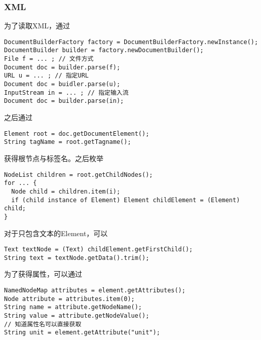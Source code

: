 \documentclass{ctexart}
\begin{document}
\subsubsection*{XML}
为了读取XML，通过
\begin{lstlisting}
DocumentBuilderFactory factory = DocumentBuilderFactory.newInstance();
DocumentBuilder builder = factory.newDocumentBuilder();
File f = ... ; // 文件方式
Document doc = builder.parse(f);
URL u = ... ; // 指定URL
Document doc = buidler.parse(u);
InputStream in = ... ; // 指定输入流
Document doc = builder.parse(in);
\end{lstlisting}
之后通过
\begin{lstlisting}
Element root = doc.getDocumentElement();
String tagName = root.getTagname();
\end{lstlisting}
获得根节点与标签名。之后枚举
\begin{lstlisting}
NodeList children = root.getChildNodes();
for ... {
  Node child = children.item(i);
  if (child instance of Element) Element childElement = (Element) child;
}
\end{lstlisting}
对于只包含文本的Element，可以
\begin{lstlisting}
Text textNode = (Text) childElement.getFirstChild();
String text = textNode.getData().trim();
\end{lstlisting}
\par
为了获得属性，可以通过
\begin{lstlisting}
NamedNodeMap attributes = element.getAttributes();
Node attribute = attributes.item(0);
String name = attribute.getNodeName();
String value = attribute.getNodeValue();
// 知道属性名可以直接获取
String unit = element.getAttribute("unit");
\end{lstlisting}
\end{document}
